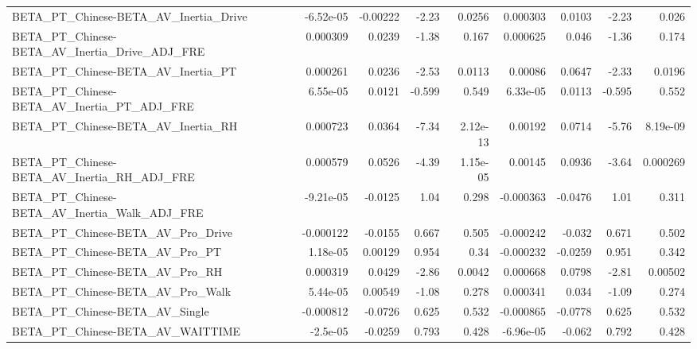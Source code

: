 \begin{tabular}{lrrrrrrrr}
BETA\_PT\_Chinese-BETA\_AV\_Inertia\_Drive              &   -6.52e-05 &     -0.00222 &    -2.23 &   0.0256 &   0.000303 &      0.0103 &        -2.23 &         0.026 \\
BETA\_PT\_Chinese-BETA\_AV\_Inertia\_Drive\_ADJ\_FRE      &    0.000309 &       0.0239 &    -1.38 &    0.167 &   0.000625 &       0.046 &        -1.36 &         0.174 \\
BETA\_PT\_Chinese-BETA\_AV\_Inertia\_PT                 &    0.000261 &       0.0236 &    -2.53 &   0.0113 &    0.00086 &      0.0647 &        -2.33 &        0.0196 \\
BETA\_PT\_Chinese-BETA\_AV\_Inertia\_PT\_ADJ\_FRE         &    6.55e-05 &       0.0121 &   -0.599 &    0.549 &   6.33e-05 &      0.0113 &       -0.595 &         0.552 \\
BETA\_PT\_Chinese-BETA\_AV\_Inertia\_RH                 &    0.000723 &       0.0364 &    -7.34 & 2.12e-13 &    0.00192 &      0.0714 &        -5.76 &      8.19e-09 \\
BETA\_PT\_Chinese-BETA\_AV\_Inertia\_RH\_ADJ\_FRE         &    0.000579 &       0.0526 &    -4.39 & 1.15e-05 &    0.00145 &      0.0936 &        -3.64 &      0.000269 \\
BETA\_PT\_Chinese-BETA\_AV\_Inertia\_Walk\_ADJ\_FRE       &   -9.21e-05 &      -0.0125 &     1.04 &    0.298 &  -0.000363 &     -0.0476 &         1.01 &         0.311 \\
BETA\_PT\_Chinese-BETA\_AV\_Pro\_Drive                  &   -0.000122 &      -0.0155 &    0.667 &    0.505 &  -0.000242 &      -0.032 &        0.671 &         0.502 \\
BETA\_PT\_Chinese-BETA\_AV\_Pro\_PT                     &    1.18e-05 &      0.00129 &    0.954 &     0.34 &  -0.000232 &     -0.0259 &        0.951 &         0.342 \\
BETA\_PT\_Chinese-BETA\_AV\_Pro\_RH                     &    0.000319 &       0.0429 &    -2.86 &   0.0042 &   0.000668 &      0.0798 &        -2.81 &       0.00502 \\
BETA\_PT\_Chinese-BETA\_AV\_Pro\_Walk                   &    5.44e-05 &      0.00549 &    -1.08 &    0.278 &   0.000341 &       0.034 &        -1.09 &         0.274 \\
BETA\_PT\_Chinese-BETA\_AV\_Single                     &   -0.000812 &      -0.0726 &    0.625 &    0.532 &  -0.000865 &     -0.0778 &        0.625 &         0.532 \\
BETA\_PT\_Chinese-BETA\_AV\_WAITTIME                   &    -2.5e-05 &      -0.0259 &    0.793 &    0.428 &  -6.96e-05 &      -0.062 &        0.792 &         0.428 \\

\end{tabular}
